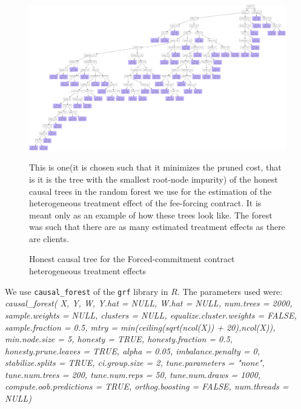\vspace{.3in}
\begin{figure}[H]
        \caption{Honest causal tree for the Forced-commitment contract heterogeneous treatment effects}
    \label{casual_tree}
    \begin{center}
        \centering
        \includegraphics[width=\textwidth]{Figuras/crf_pro_2_apr.pdf}
    \end{center}
    \footnotesize 
    This is one(it is chosen such that it minimizes the pruned cost, that is it is the tree with the smallest root-node impurity) of the honest causal trees in the random forest we use for the estimation of the heterogeneous treatment effect of the fee-forcing contract. It is meant only as an example of how these trees look like. The forest was such that there are as many estimated treatment effects as there are clients.
\end{figure}

We use \cite{atheygrf} \texttt{causal\_forest} of the \texttt{grf} library in $R$. The parameters used were:
\scriptsize{\textit{causal\_forest(
  X, 
  Y, 
  W, 
  Y.hat = NULL, 
  W.hat = NULL, 
  num.trees = 2000, 
  sample.weights = NULL, 
  clusters = NULL, 
  equalize.cluster.weights = FALSE, 
  sample.fraction = 0.5, 
  mtry = min(ceiling(sqrt(ncol(X)) + 20),ncol(X)), 
  min.node.size = 5, 
  honesty = TRUE, 
  honesty.fraction = 0.5, 
  honesty.prune.leaves = TRUE, 
  alpha = 0.05, 
  imbalance.penalty = 0, 
  stabilize.splits = TRUE, 
  ci.group.size = 2, 
  tune.parameters = "none", 
  tune.num.trees = 200, 
  tune.num.reps = 50, 
  tune.num.draws = 1000, 
  compute.oob.predictions = TRUE, 
  orthog.boosting = FALSE, 
  num.threads = NULL)}}


